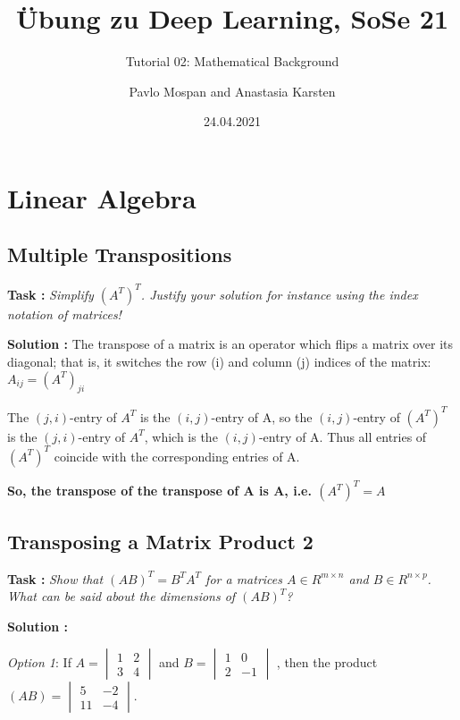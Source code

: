\documentclass{scrartcl}
\begin{document}
\title{Übung zu Deep Learning, SoSe 21}
\subtitle{Tutorial 02: Mathematical Background}
\author{Pavlo Mospan and Anastasia Karsten}
\date{24.04.2021} 
\maketitle

\section{Linear Algebra}

\subsection{Multiple Transpositions}

\textbf{Task :} \textit{Simplify $(A^T)^T$. Justify your solution for instance using the index notation of matrices!}

\textbf{Solution :} 
The transpose of a matrix is an operator which flips a matrix over its diagonal; that is, it switches the row (i) and column (j) indices of the matrix: $A_{ij} = (A^T)_{ji}$

The $(j,i)$-entry of $A^T$ is the $(i,j)$-entry of A, so the $(i,j)$-entry of $(A^T)^T$ is the $(j,i)$-entry of $A^T$, which is the $(i,j)$-entry of A. Thus all entries of $(A^T)^T$ coincide with the corresponding entries of A.

\textbf{So, the transpose of the transpose of A is A, i.e. \((A^T)^T = A\)}

\subsection{Transposing a Matrix Product 2}
\textbf{Task :} \textit{Show that $(AB)^T = B^T A^T$ for a matrices $A \in R^{m \times n}$ and $B \in R^{n \times p}$. What can be said about the dimensions of $(AB)^T$?}

\textbf{Solution :} 

\textit{Option 1}: If $A = 
\begin{vmatrix}
1 & 2\\
3 & 4
\end{vmatrix}$
and $B = 
\begin{vmatrix}
1 & 0 \\
2 & -1
\end{vmatrix}$
, then the product $(AB) =
\begin{vmatrix}
5 & -2 \\
11 & -4
\end{vmatrix}$.
\end{document}
